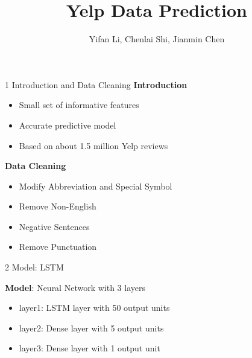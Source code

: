 \documentclass[10pt]{beamer}
\title{Yelp Data Prediction}
\date{}
\author{Yifan Li, Chenlai Shi, Jianmin Chen}
\institute{Monday Group 1}
\begin{document}
\maketitle



\begin{frame}{1 Introduction and Data Cleaning}
\textbf{Introduction}
\begin{itemize}
	\item Small set of informative features
	\item Accurate predictive model
	\item Based on about 1.5 million Yelp reviews
\end{itemize}

\textbf{Data Cleaning}
\begin{itemize}
	\item Modify Abbreviation and Special Symbol

	\item Remove Non-English

	\item Negative Sentences
	
	\item Remove Punctuation
\end{itemize}
\end{frame}




\begin{frame}{2 Model: LSTM}

\textbf{Model}: Neural Network with 3 layers\\
\begin{itemize}
	\item layer1: LSTM layer with 50 output units
	\item layer2: Dense layer with 5 output units
	\item layer3: Dense layer with 1 output unit
\end{itemize}




\end{frame}
\end{document}
